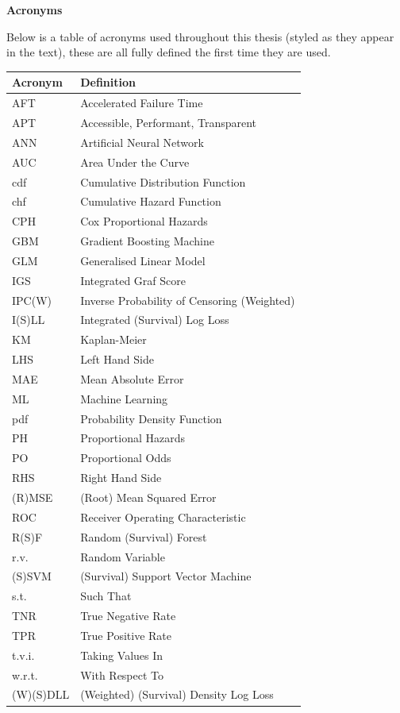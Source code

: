 \documentclass[
  letterpaper,
]{scrbook}
\theoremstyle{plain}
\theoremstyle{definition}
\theoremstyle{remark}
\begin{document}
\textbf{Acronyms}

Below is a table of acronyms used throughout this thesis (styled as they
appear in the text), these are all fully defined the first time they are
used.

\begin{longtable}[]{@{}ll@{}}
\toprule()
Acronym & Definition \\
\midrule()
\endhead
AFT & Accelerated Failure Time \\
APT & Accessible, Performant, Transparent \\
ANN & Artificial Neural Network \\
AUC & Area Under the Curve \\
cdf & Cumulative Distribution Function \\
chf & Cumulative Hazard Function \\
CPH & Cox Proportional Hazards \\
GBM & Gradient Boosting Machine \\
GLM & Generalised Linear Model \\
IGS & Integrated Graf Score \\
IPC(W) & Inverse Probability of Censoring (Weighted) \\
I(S)LL & Integrated (Survival) Log Loss \\
KM & Kaplan-Meier \\
LHS & Left Hand Side \\
MAE & Mean Absolute Error \\
ML & Machine Learning \\
pdf & Probability Density Function \\
PH & Proportional Hazards \\
PO & Proportional Odds \\
RHS & Right Hand Side \\
(R)MSE & (Root) Mean Squared Error \\
ROC & Receiver Operating Characteristic \\
R(S)F & Random (Survival) Forest \\
r.v. & Random Variable \\
(S)SVM & (Survival) Support Vector Machine \\
s.t. & Such That \\
TNR & True Negative Rate \\
TPR & True Positive Rate \\
t.v.i. & Taking Values In \\
w.r.t. & With Respect To \\
(W)(S)DLL & (Weighted) (Survival) Density Log Loss \\
\bottomrule()
\end{longtable}
\end{document}
